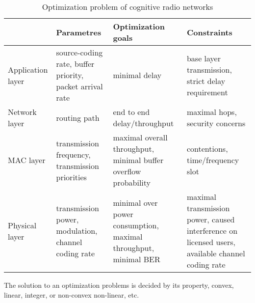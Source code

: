 \begin{table}
\begin{tabular}{|C{2.2cm}|C{3.8cm} | C{3.5cm} | C{3.7cm}|}
\hline 
 & Parametres & Optimization goals & Constraints \\ 
\hline 
Application layer & source-coding rate, buffer priority, packet arrival rate & minimal delay & base layer transmission, strict delay requirement \\ 
\hline 
Network layer & routing path & end to end delay/throughput & maximal hops, security concerns \\ 
\hline 
MAC layer & transmission frequency, transmission priorities & maximal overall throughput, minimal buffer overflow probability & contentions, time/frequency slot \\ 
\hline
Physical layer & transmission power, modulation, channel coding rate & minimal over power consumption, maximal throughput, minimal BER & maximal transmission power, caused interference on licensed users, available channel coding rate \\ 
\hline
\end{tabular} 
\caption{Optimization problem of cognitive radio networks}
\label{opt_table} 
\end{table}

The solution to an optimization problems is decided by its property, \ie convex, linear, integer, or non-convex non-linear, etc.


